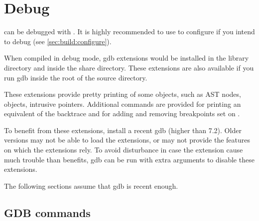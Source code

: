 \section{Debug}
\label{sec:build:debug}

\urbi can be debugged with .  It is highly recommended to use
 to configure if you intend to
debug (see \autoref{sec:build:configure}).

When compiled in debug mode, gdb extensions would be installed in the
library directory and inside the share directory.  These extensions are also
available if you run gdb inside the root of the source directory.

These extensions provide pretty printing of some \Cxx objects, such as AST
nodes, \urbi objects, intrusive pointers.  Additional commands are provided
for printing an equivalent of the \us backtrace and for adding and removing
breakpoints set on \us.

To benefit from these extensions, install a recent gdb (higher than 7.2).
Older versions may not be able to load the extensions, or may not provide
the features on which the extensions rely.  To avoid disturbance in case the
extension cause much trouble than benefits, gdb can be run with extra
arguments to disable these extensions.


The following sections assume that gdb is recent enough.

\subsection{GDB commands}

